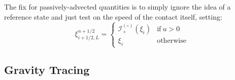 \documentclass[12pt,preprint]{aastex}
\newcommand{\evz}{{(\circ)}}
\begin{document}
The fix for passively-advected quantities is to simply ignore the 
idea of a reference state and just test on the speed of the contact
itself, setting:
\begin{equation}
\xi_{i+1/2,L}^{n+1/2} = \left \{ \begin{array}{cc}
       \mathcal{I}_+^\evz(\xi_i) & \mathrm{if~} u  > 0 \\
       \xi_i                    & \mathrm{otherwise}
\end{array}
\right .
\end{equation}



\subsection{Gravity Tracing}
\end{document}
